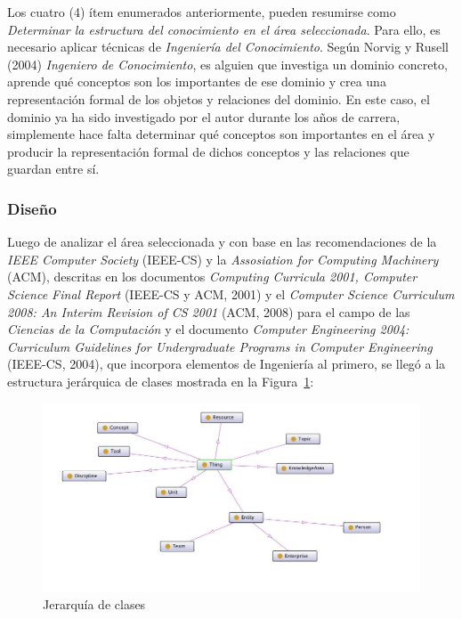 \begin{itemize}
Los cuatro (4) ítem enumerados anteriormente, pueden resumirse como \textit{Determinar la estructura del conocimiento en el área seleccionada}. Para ello, es necesario aplicar técnicas de \textit{Ingeniería del Conocimiento}. Según Norvig y Rusell (2004) \textit{Ingeniero de Conocimiento}, es alguien que investiga un dominio concreto, aprende qué conceptos son los importantes de ese dominio y crea una representación formal de los objetos y relaciones del dominio. En este caso, el dominio ya ha sido investigado por el autor durante los años de carrera, simplemente hace falta determinar qué conceptos son importantes en el área y producir la representación formal de dichos conceptos y las relaciones que guardan entre sí.

\subsubsection{Diseño}
Luego de analizar el área seleccionada y con base en las recomendaciones de la \textit{IEEE Computer Society} (IEEE-CS) y la \textit{Assosiation for Computing Machinery} (ACM), descritas en los documentos \textit{Computing Curricula 2001, Computer Science Final Report} (IEEE-CS y ACM, 2001) y el \textit{Computer Science Curriculum 2008: An Interim Revision of CS 2001} (ACM, 2008) para el campo de las \textit{Ciencias de la Computación} y el documento \textit{Computer Engineering 2004: Curriculum Guidelines for Undergraduate Programs in Computer Engineering} (IEEE-CS, 2004), que incorpora elementos de Ingeniería al primero, se llegó a la estructura jerárquica de clases mostrada en la Figura~\ref{classHierarchy}:


\begin{figure}[h!]
    \begin{center}
        \includegraphics[scale=0.5]{images/onto_graph_classes.jpg}
        \caption{Jerarquía de clases}
        \label{classHierarchy}
    \end{center}
\end{figure}


\end{itemize}
